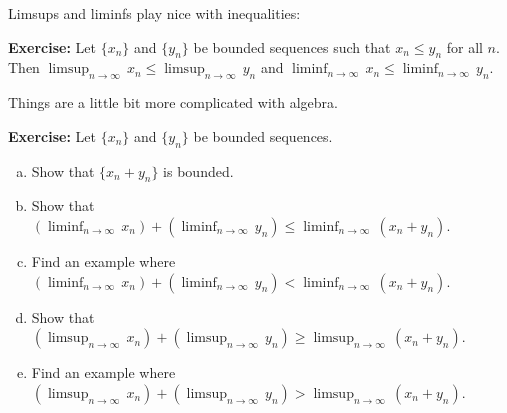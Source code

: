 \documentclass[10pt,aspectratio=149]{beamer}
\begin{document}
\begin{frame}

Limsups and liminfs play nice with inequalities:

\pause
\medskip

\textbf{Exercise:}
Let $\{ x_n \}$ and $\{ y_n \}$ be bounded sequences such that
$x_n \leq y_n$ for all $n$.  Then
\quad
$\displaystyle
\limsup_{n\to\infty} \, x_n \leq
\limsup_{n\to\infty} \, y_n$
\quad
and
\quad
$\displaystyle
\liminf_{n\to\infty} \, x_n \leq
\liminf_{n\to\infty} \, y_n$.

\pause
\medskip

Things are a little bit more complicated with algebra.

\pause
\medskip

\textbf{Exercise:}
Let $\{ x_n \}$ and $\{ y_n \}$ be bounded sequences.
\begin{enumerate}[a)]
\item\pause
Show that $\{ x_n + y_n \}$ is bounded.
\item
Show that
\quad $\displaystyle
(\liminf_{n\to \infty}\, x_n)
+
(\liminf_{n\to \infty}\, y_n)
\leq
\liminf_{n\to \infty}\, (x_n+y_n)$.
\item\pause
Find an example where
$\displaystyle
(\liminf_{n\to \infty}\, x_n)
+
(\liminf_{n\to \infty}\, y_n)
<
\liminf_{n\to \infty}\, (x_n+y_n)$.
\item\pause
Show that
\quad $\displaystyle
(\limsup_{n\to \infty}\, x_n)
+
(\limsup_{n\to \infty}\, y_n)
\geq
\limsup_{n\to \infty}\, (x_n+y_n)$.
\item\pause
Find an example where
$\displaystyle
(\limsup_{n\to \infty}\, x_n)
+
(\limsup_{n\to \infty}\, y_n)
>
\limsup_{n\to \infty}\, (x_n+y_n)$.
\end{enumerate}

\end{frame}
\end{document}
